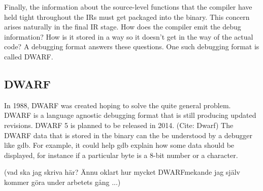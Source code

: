 Finally, the information  about the source-level functions that the compiler
have held tight throughout the IRs must get packaged into the binary. This
concern arises naturally in the final IR stage.  How does the compiler emit the
debug information? How is it stored in a way so it doesn't get in the way of the
actual code?  A debugging format answers these questions. One such debugging
format is called DWARF.

\subsection{DWARF}

In 1988, DWARF was created hoping to solve the quite general problem. DWARF is
a language agnostic debugging format that is still producing updated revisions.
DWARF 5 is planned to be released in 2014. (Cite: Dwarf) The DWARF data that is
stored in the binary can the be understood by a debugger like gdb. For example,
it could help gdb explain how some data should be displayed, for instance if a
particular byte is a 8-bit number or a character. %


(vad ska jag skriva här? Ännu oklart hur mycket DWARFmekande jag själv kommer
göra under arbetets gång ...)

